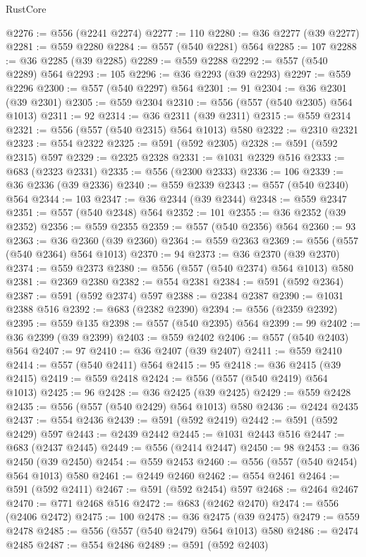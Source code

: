 \begin{lexlean}{RustCore}
\begin{coremodule}
@2276 := @556 (@2241 @2274)
@2277 := 110
@2280 := @36 @2277 (@39 @2277)
@2281 := @559 @2280
@2284 := @557 (@540 @2281) @564
@2285 := 107
@2288 := @36 @2285 (@39 @2285)
@2289 := @559 @2288
@2292 := @557 (@540 @2289) @564
@2293 := 105
@2296 := @36 @2293 (@39 @2293)
@2297 := @559 @2296
@2300 := @557 (@540 @2297) @564
@2301 := 91
@2304 := @36 @2301 (@39 @2301)
@2305 := @559 @2304
@2310 := @556 (@557 (@540 @2305) @564 @1013)
@2311 := 92
@2314 := @36 @2311 (@39 @2311)
@2315 := @559 @2314
@2321 := @556 (@557 (@540 @2315) @564 @1013) @580
@2322 := @2310 @2321
@2323 := @554 @2322
@2325 := @591 (@592 @2305)
@2328 := @591 (@592 @2315) @597
@2329 := @2325 @2328
@2331 := @1031 @2329 @516
@2333 := @683 (@2323 @2331)
@2335 := @556 (@2300 @2333)
@2336 := 106
@2339 := @36 @2336 (@39 @2336)
@2340 := @559 @2339
@2343 := @557 (@540 @2340) @564
@2344 := 103
@2347 := @36 @2344 (@39 @2344)
@2348 := @559 @2347
@2351 := @557 (@540 @2348) @564
@2352 := 101
@2355 := @36 @2352 (@39 @2352)
@2356 := @559 @2355
@2359 := @557 (@540 @2356) @564
@2360 := 93
@2363 := @36 @2360 (@39 @2360)
@2364 := @559 @2363
@2369 := @556 (@557 (@540 @2364) @564 @1013)
@2370 := 94
@2373 := @36 @2370 (@39 @2370)
@2374 := @559 @2373
@2380 := @556 (@557 (@540 @2374) @564 @1013) @580
@2381 := @2369 @2380
@2382 := @554 @2381
@2384 := @591 (@592 @2364)
@2387 := @591 (@592 @2374) @597
@2388 := @2384 @2387
@2390 := @1031 @2388 @516
@2392 := @683 (@2382 @2390)
@2394 := @556 (@2359 @2392)
@2395 := @559 @135
@2398 := @557 (@540 @2395) @564
@2399 := 99
@2402 := @36 @2399 (@39 @2399)
@2403 := @559 @2402
@2406 := @557 (@540 @2403) @564
@2407 := 97
@2410 := @36 @2407 (@39 @2407)
@2411 := @559 @2410
@2414 := @557 (@540 @2411) @564
@2415 := 95
@2418 := @36 @2415 (@39 @2415)
@2419 := @559 @2418
@2424 := @556 (@557 (@540 @2419) @564 @1013)
@2425 := 96
@2428 := @36 @2425 (@39 @2425)
@2429 := @559 @2428
@2435 := @556 (@557 (@540 @2429) @564 @1013) @580
@2436 := @2424 @2435
@2437 := @554 @2436
@2439 := @591 (@592 @2419)
@2442 := @591 (@592 @2429) @597
@2443 := @2439 @2442
@2445 := @1031 @2443 @516
@2447 := @683 (@2437 @2445)
@2449 := @556 (@2414 @2447)
@2450 := 98
@2453 := @36 @2450 (@39 @2450)
@2454 := @559 @2453
@2460 := @556 (@557 (@540 @2454) @564 @1013) @580
@2461 := @2449 @2460
@2462 := @554 @2461
@2464 := @591 (@592 @2411)
@2467 := @591 (@592 @2454) @597
@2468 := @2464 @2467
@2470 := @771 @2468 @516
@2472 := @683 (@2462 @2470)
@2474 := @556 (@2406 @2472)
@2475 := 100
@2478 := @36 @2475 (@39 @2475)
@2479 := @559 @2478
@2485 := @556 (@557 (@540 @2479) @564 @1013) @580
@2486 := @2474 @2485
@2487 := @554 @2486
@2489 := @591 (@592 @2403)

\end{coremodule}
\end{lexlean}
